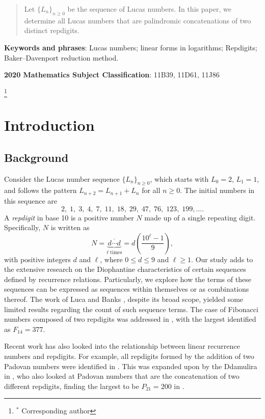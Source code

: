 \maketitle
\begin{abstract}
  Let $ \{L_n\}_{n\geq 0} $ be the sequence of Lucas numbers. In this paper, we determine all Lucas numbers that are palindromic concatenations of two distinct repdigits.
\end{abstract}

{\bf Keywords and phrases}: Lucas numbers; linear forms in logarithms; Repdigits; Baker--Davenport reduction method.
 
{\bf 2020 Mathematics Subject Classification}: 11B39, 11D61, 11J86

\thanks{$ ^{*} $ Corresponding author}

\section{Introduction}\label{intro}
\subsection{Background}
\label{sec:1.1}
Consider the Lucas number sequence $\{L_n\}_{n\ge 0}$, which starts with $L_0=2$, $L_1=1$, and follows the pattern $L_{n+2}=L_{n+1}+L_{n}$ for all $n \geq 0$. The initial numbers in this sequence are
$$
2,\;1,\;3,\;4,\;7,\;11,\;18,\;29,\;47,\;76,\;123,\;199,\ldots.
$$
A \textit{repdigit} in base 10 is a positive number $N$ made up of a single repeating digit. Specifically, $N$ is written as
\[
N = \underbrace{\overline{d\cdots d}}_{\ell \text{ times}} = d \left( \frac{10^\ell - 1}{9} \right),
\]
with positive integers \(d\) and \( \ell \), where \(0 \leq d \leq 9\) and \( \ell \geq 1\). Our study adds to the extensive research on the Diophantine characteristics of certain sequences defined by recurrence relations. Particularly, we explore how the terms of these sequences can be expressed as sequences within themselves or as combinations thereof. The work of Luca and Banks \cite{banks}, despite its broad scope, yielded some limited results regarding the count of such sequence terms. The case of Fibonacci numbers composed of two repdigits was addressed in \cite{ala}, with the largest identified as \(F_{14} = 377\).

Recent work has also looked into the relationship between linear recurrence numbers and repdigits. For example, all repdigits formed by the addition of two Padovan numbers were identified in \cite{gar}. This was expanded upon by the Ddamulira in \cite{dda}, who also looked at Padovan numbers that are the concatenation of two different repdigits, finding the largest to be \(P_{21} = 200\) in \cite{dda2}.

